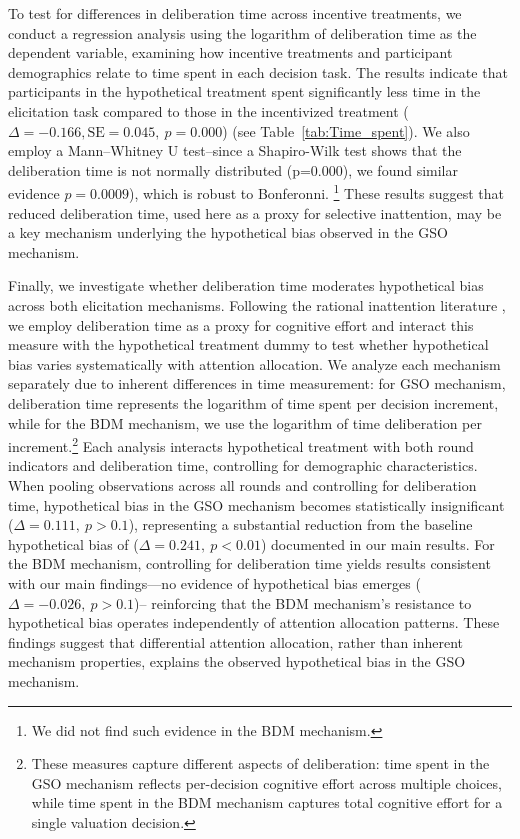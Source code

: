 \documentclass[12pt]{article}
\begin{document}
To test for differences in deliberation time across incentive treatments, we conduct a regression analysis using the logarithm of deliberation time as the dependent variable, examining how incentive treatments and participant demographics relate to time spent in each decision task. The results indicate that participants in the hypothetical treatment spent significantly less time in the elicitation task compared to those in the incentivized treatment  (\(\Delta = -0.166, \text{SE} = 0.045,\ p = 0.000\)) (see  Table~\ref{tab:Time_spent}). We also employ a Mann–Whitney U test--since a Shapiro-Wilk test shows that the deliberation time is not normally distributed (p=0.000), we found similar evidence \(p = 0.0009\)), which is robust to Bonferonni. \footnote{We did not find such evidence in the BDM mechanism.} These results suggest that reduced deliberation time, used here as a proxy for selective inattention, may be a key mechanism underlying the hypothetical bias observed in the GSO mechanism.



Finally, we investigate whether deliberation time moderates hypothetical bias across both elicitation mechanisms. Following the rational inattention literature \citep{sims2003implications, alaoui2016endogenous}, we employ deliberation time as a proxy for cognitive effort and interact this measure with the hypothetical treatment dummy to test whether hypothetical bias  varies systematically with attention allocation. We analyze each mechanism separately due to inherent differences in time measurement: for GSO mechanism, deliberation time represents the logarithm of time spent per decision increment, while for the BDM mechanism, we use the logarithm of time deliberation per increment.\footnote{These measures capture different aspects of deliberation: time spent in the GSO mechanism reflects per-decision cognitive effort across multiple choices, while  time spent in the BDM mechanism captures total cognitive effort for a single valuation decision.} Each analysis interacts hypothetical treatment with both round indicators and deliberation time, controlling for demographic characteristics. When pooling observations across all rounds and controlling for deliberation time, hypothetical bias in the GSO mechanism becomes statistically insignificant (\(\Delta = 0.111,\ p > 0.1\)), representing a substantial reduction from the baseline hypothetical bias of (\(\Delta = 0.241,\ p < 0.01\)) documented in our main results. For the BDM mechanism, controlling for deliberation time yields results consistent with our main findings—no evidence of hypothetical bias emerges (\(\Delta =-0.026,\ p > 0.1\))-- reinforcing that the BDM mechanism's resistance to hypothetical bias operates independently of attention allocation patterns. These findings suggest that differential attention allocation, rather than inherent mechanism properties, explains the observed hypothetical bias in the GSO mechanism. 
\end{document}
